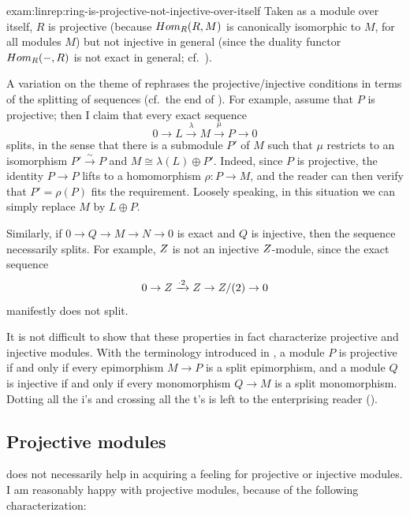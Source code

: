 \begin{exam}{}{exam:linrep:ring-is-projective-not-injective-over-itself}
  Taken as a module over itself, $R$ is projective (because
  $Hom_R(R, M)$ is canonically isomorphic to $M$, for all modules
  $M$) but not injective in general (since the duality functor
  $Hom_R(-, R)$ is not exact in general; cf.\
  ).
\end{exam}

A variation on the theme of  rephrases the
projective/injective conditions in terms of the splitting of sequences
(cf.\ the end of
). For example,
assume that $P$ is projective; then I claim that every exact sequence
\[
  0 \to L \xrightarrow{\lambda} M \xrightarrow{\mu} P \to 0
\]
splits, in the sense that there is a submodule $P'$ of $M$ such that
$\mu$ restricts to an isomorphism $P' \xrightarrow{\sim} P$ and
$M \cong \lambda(L) \oplus P'$. Indeed, since $P$ is projective, the
identity $P \to P$ lifts to a homomorphism $\rho : P \to M$, and the
reader can then verify that $P' = \rho(P)$ fits the requirement.
Loosely speaking, in this situation we can simply replace $M$ by
$L \oplus P$.

Similarly, if $0 \to Q \to M \to N \to 0$ is exact and $Q$ is
injective, then the sequence necessarily splits. For example, $Z$ is
not an injective $Z$-module, since the exact sequence
\[
  0 \to Z \xrightarrow{\cdot 2} Z \to Z/(2) \to 0
\]
manifestly does not split.

It is not difficult to show that these properties in fact characterize
projective and injective modules. With the terminology introduced in
\Cref{subsec:rings:complexes-and-exact-sequences}, a module $P$ is
projective if and only if every epimorphism $M \to P$ is a split
epimorphism, and a module $Q$ is injective if and only if every
monomorphism $Q \to M$ is a split monomorphism. Dotting all the i's
and crossing all the t's is left to the enterprising reader
().

\subsection{Projective modules}
\label{subsec:linrep:projective-modules}
 does not necessarily help in acquiring a
feeling for projective or injective modules. I am reasonably happy
with projective modules, because of the following characterization:


